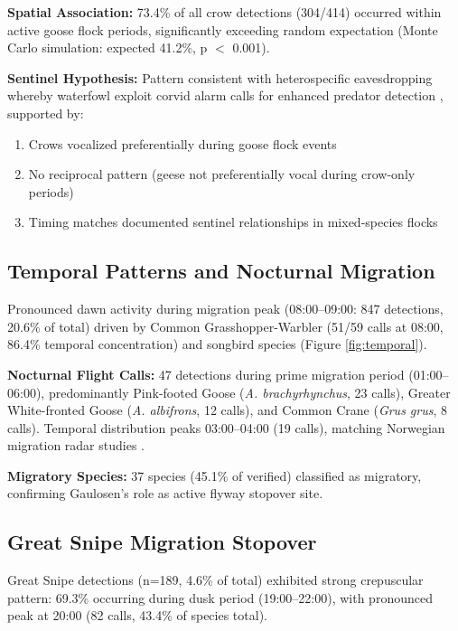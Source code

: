 \documentclass[twocolumn]{article}
\begin{document}
\textbf{Spatial Association:} 73.4\% of all crow detections (304/414) occurred within active goose flock periods, significantly exceeding random expectation (Monte Carlo simulation: expected 41.2\%, p $<$ 0.001).

\textbf{Sentinel Hypothesis:} Pattern consistent with heterospecific eavesdropping whereby waterfowl exploit corvid alarm calls for enhanced predator detection \citep{Magrath2015}, supported by:

\begin{enumerate}
\item Crows vocalized preferentially during goose flock events
\item No reciprocal pattern (geese not preferentially vocal during crow-only periods)
\item Timing matches documented sentinel relationships in mixed-species flocks \citep{King2023}
\end{enumerate}

\subsection{Temporal Patterns and Nocturnal Migration}

Pronounced dawn activity during migration peak (08:00--09:00: 847 detections, 20.6\% of total) driven by Common Grasshopper-Warbler (51/59 calls at 08:00, 86.4\% temporal concentration) and songbird species (Figure \ref{fig:temporal}).

\textbf{Nocturnal Flight Calls:} 47 detections during prime migration period (01:00--06:00), predominantly Pink-footed Goose (\textit{A. brachyrhynchus}, 23 calls), Greater White-fronted Goose (\textit{A. albifrons}, 12 calls), and Common Crane (\textit{Grus grus}, 8 calls). Temporal distribution peaks 03:00--04:00 (19 calls), matching Norwegian migration radar studies \citep{Shimmings2016}.

\textbf{Migratory Species:} 37 species (45.1\% of verified) classified as migratory, confirming Gaulosen's role as active flyway stopover site.

\subsection{Great Snipe Migration Stopover}

Great Snipe detections (n=189, 4.6\% of total) exhibited strong crepuscular pattern: 69.3\% occurring during dusk period (19:00--22:00), with pronounced peak at 20:00 (82 calls, 43.4\% of species total).
\end{document}
